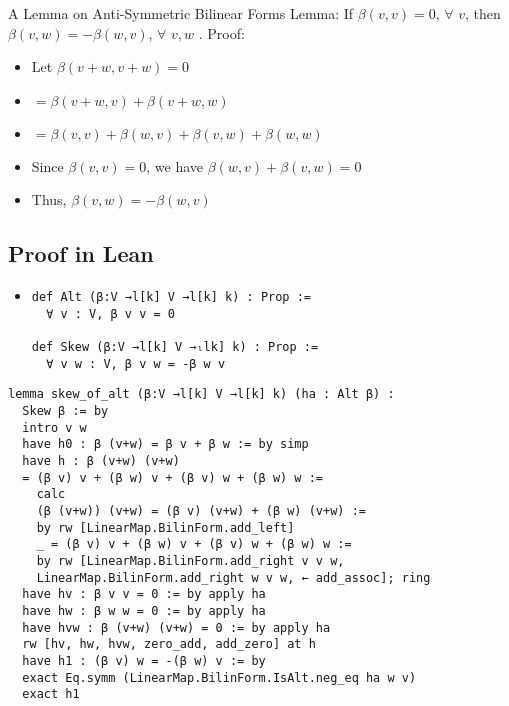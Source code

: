 \documentclass{beamer}
\begin{document}
\begin{frame} {A Lemma on Anti-Symmetric Bilinear Forms}
Lemma: If $\beta (v,v) = 0$, $\forall$ $v$, then $\beta (v,w) = -\beta(w,v)$, $\forall$ $v,w$ .
Proof:
\begin{itemize}
    \item Let $\beta(v+w,v+w)=0$
    \item $=\beta(v+w,v)+\beta(v+w,w)$
    \item $=\beta(v,v)+\beta(w,v)+\beta(v,w)+\beta(w,w)$
    \item Since $\beta (v,v)=0$, we have $\beta (w,v)+\beta(v,w)=0$
    \item Thus, $\beta(v,w)=-\beta(w,v)$
\end{itemize} 
\end{frame}

\subsection{Proof in Lean}
\begin{itemize}
    \item 
    \begin{verbatim}
def Alt (β:V →l[k] V →l[k] k) : Prop :=
  ∀ v : V, β v v = 0

def Skew (β:V →l[k] V →ₗlk] k) : Prop :=
  ∀ v w : V, β v w = -β w v
    \end{verbatim}
\end{itemize}




{\tiny
\begin{verbatim}
lemma skew_of_alt (β:V →l[k] V →l[k] k) (ha : Alt β) :
  Skew β := by
  intro v w 
  have h0 : β (v+w) = β v + β w := by simp
  have h : β (v+w) (v+w) 
  = (β v) v + (β w) v + (β v) w + (β w) w := 
    calc 
    (β (v+w)) (v+w) = (β v) (v+w) + (β w) (v+w) := 
    by rw [LinearMap.BilinForm.add_left]
    _ = (β v) v + (β w) v + (β v) w + (β w) w :=
    by rw [LinearMap.BilinForm.add_right v v w, 
    LinearMap.BilinForm.add_right w v w, ← add_assoc]; ring
  have hv : β v v = 0 := by apply ha
  have hw : β w w = 0 := by apply ha
  have hvw : β (v+w) (v+w) = 0 := by apply ha
  rw [hv, hw, hvw, zero_add, add_zero] at h
  have h1 : (β v) w = -(β w) v := by 
  exact Eq.symm (LinearMap.BilinForm.IsAlt.neg_eq ha w v)
  exact h1
\end{verbatim}
}
\end{document}
